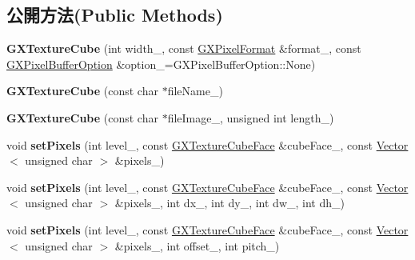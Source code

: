 \subsection*{公開方法(Public Methods)}
\begin{DoxyCompactItemize}
\item 
{\bfseries G\+X\+Texture\+Cube} (int width\+\_\+, const \hyperlink{class_i_dream_sky_1_1_g_x_pixel_format}{G\+X\+Pixel\+Format} \&format\+\_\+, const \hyperlink{class_i_dream_sky_1_1_g_x_pixel_buffer_option}{G\+X\+Pixel\+Buffer\+Option} \&option\+\_\+=G\+X\+Pixel\+Buffer\+Option\+::\+None)\hypertarget{class_i_dream_sky_1_1_g_x_texture_cube_a35d73099ea45efde243e40a6e7bedd86}{}\label{class_i_dream_sky_1_1_g_x_texture_cube_a35d73099ea45efde243e40a6e7bedd86}

\item 
{\bfseries G\+X\+Texture\+Cube} (const char $\ast$file\+Name\+\_\+)\hypertarget{class_i_dream_sky_1_1_g_x_texture_cube_aacfb52320d982ae93f13781db7445ec9}{}\label{class_i_dream_sky_1_1_g_x_texture_cube_aacfb52320d982ae93f13781db7445ec9}

\item 
{\bfseries G\+X\+Texture\+Cube} (const char $\ast$file\+Image\+\_\+, unsigned int length\+\_\+)\hypertarget{class_i_dream_sky_1_1_g_x_texture_cube_a5f7a0834c310063baecdfba2c28ee3d6}{}\label{class_i_dream_sky_1_1_g_x_texture_cube_a5f7a0834c310063baecdfba2c28ee3d6}

\item 
void {\bfseries set\+Pixels} (int level\+\_\+, const \hyperlink{class_i_dream_sky_1_1_g_x_texture_cube_face}{G\+X\+Texture\+Cube\+Face} \&cube\+Face\+\_\+, const \hyperlink{class_i_dream_sky_1_1_vector}{Vector}$<$ unsigned char $>$ \&pixels\+\_\+)\hypertarget{class_i_dream_sky_1_1_g_x_texture_cube_af2142d3c038e773d1b43127a3bd1fb06}{}\label{class_i_dream_sky_1_1_g_x_texture_cube_af2142d3c038e773d1b43127a3bd1fb06}

\item 
void {\bfseries set\+Pixels} (int level\+\_\+, const \hyperlink{class_i_dream_sky_1_1_g_x_texture_cube_face}{G\+X\+Texture\+Cube\+Face} \&cube\+Face\+\_\+, const \hyperlink{class_i_dream_sky_1_1_vector}{Vector}$<$ unsigned char $>$ \&pixels\+\_\+, int dx\+\_\+, int dy\+\_\+, int dw\+\_\+, int dh\+\_\+)\hypertarget{class_i_dream_sky_1_1_g_x_texture_cube_a1fde40d0364534b5ad661a58722c92c2}{}\label{class_i_dream_sky_1_1_g_x_texture_cube_a1fde40d0364534b5ad661a58722c92c2}

\item 
void {\bfseries set\+Pixels} (int level\+\_\+, const \hyperlink{class_i_dream_sky_1_1_g_x_texture_cube_face}{G\+X\+Texture\+Cube\+Face} \&cube\+Face\+\_\+, const \hyperlink{class_i_dream_sky_1_1_vector}{Vector}$<$ unsigned char $>$ \&pixels\+\_\+, int offset\+\_\+, int pitch\+\_\+)\hypertarget{class_i_dream_sky_1_1_g_x_texture_cube_a80e80831ac48023f7e2314e30e0a8cb1}{}\label{class_i_dream_sky_1_1_g_x_texture_cube_a80e80831ac48023f7e2314e30e0a8cb1}


\end{DoxyCompactItemize}
